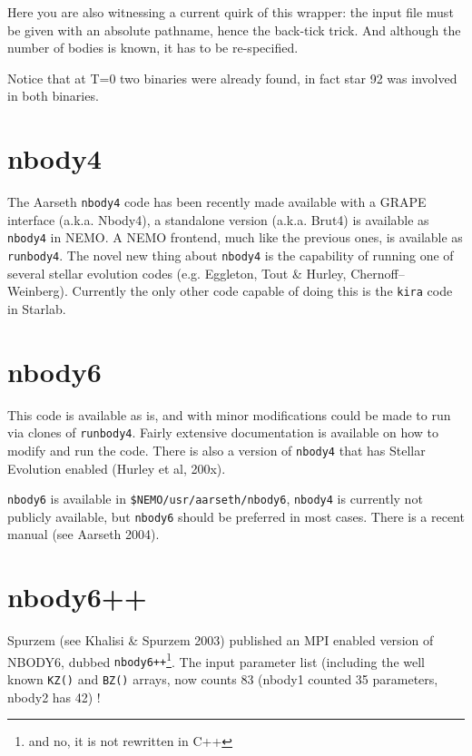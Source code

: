 Here you are also witnessing a current quirk of this wrapper: the input file
must be given with an absolute pathname, hence the back-tick trick. And 
although the number of bodies is known, it has to be re-specified.

Notice that at T=0 two binaries were already found, in fact star 92 was
involved in both binaries.


% 
% 
% 

\section{nbody4}

The Aarseth {\tt nbody4} code has been recently made available with a GRAPE
interface (a.k.a. Nbody4), a standalone version  (a.k.a. Brut4) is available
as {\tt nbody4} in NEMO. A NEMO frontend, much like the previous ones, is 
available as {\tt runbody4}. The novel new thing about {\tt nbody4} is the
capability of running one of several stellar evolution codes
(e.g. Eggleton, Tout \& Hurley, Chernoff--Weinberg). Currently the only other
code capable of doing this is the {\tt kira} code in Starlab.

\section{nbody6}

This code is available as is, and with minor modifications could be made to run
via clones of {\tt runbody4}. Fairly extensive documentation is available on how
to modify and run the code.
 There is also a version of {\tt nbody4} that
has Stellar Evolution enabled (Hurley et al, 200x).

{\tt nbody6} is available in {\tt \$NEMO/usr/aarseth/nbody6}, 
{\tt nbody4} is currently not publicly available, but 
{\tt nbody6} should be preferred in most cases. There is a
recent manual (see Aarseth 2004).


\section{nbody6++}

Spurzem (see Khalisi \& Spurzem 2003) published an MPI enabled version
of NBODY6, dubbed {\tt nbody6++}\footnote{and no, it is not rewritten in C++}.
The input parameter list (including the well known {\tt KZ()} and {\tt BZ()}
arrays, now counts 83  (nbody1 counted 35 parameters, nbody2 has 42) !

